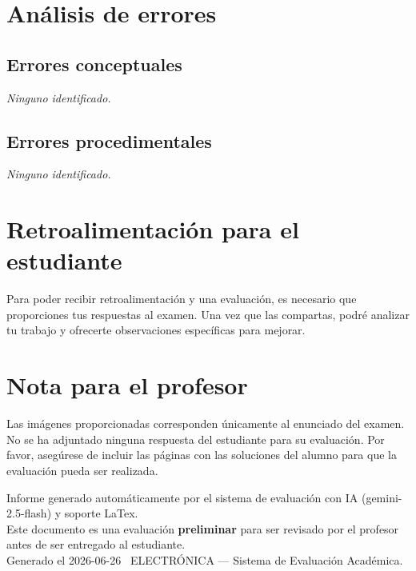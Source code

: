 \documentclass[11pt,a4paper]{article}
\begin{document}
\section*{Análisis de errores}

\subsection*{Errores conceptuales}
\textit{Ninguno identificado.}

\subsection*{Errores procedimentales}
\textit{Ninguno identificado.}

\section*{Retroalimentación para el estudiante}
\begin{tcolorbox}[cajaRecomendacion, title={Dirigido a: 2}]
Para poder recibir retroalimentación y una evaluación, es necesario que proporciones tus respuestas al examen. Una vez que las compartas, podré analizar tu trabajo y ofrecerte observaciones específicas para mejorar.
\end{tcolorbox}

\section*{Nota para el profesor}
\begin{tcolorbox}[
  enhanced, breakable,
  colback=yellow!8, colframe=yellow!60!black,
  fonttitle=\bfseries, coltitle=black,
  title={Observaciones para revisión manual},
  top=4pt, bottom=4pt, left=8pt, right=8pt,
]
Las imágenes proporcionadas corresponden únicamente al enunciado del examen. No se ha adjuntado ninguna respuesta del estudiante para su evaluación. Por favor, asegúrese de incluir las páginas con las soluciones del alumno para que la evaluación pueda ser realizada.
\end{tcolorbox}

\vspace{12pt}
\begin{center}
  \footnotesize\color{gray}
  Informe generado automáticamente por el sistema de evaluación con IA (gemini-2.5-flash) y soporte LaTex. \\
  Este documento es una evaluación \textbf{preliminar} para ser revisado por el profesor antes de ser entregado al 
  estudiante. \\
  Generado el 2026-06-26 \textbullet\ ELECTRÓNICA --- Sistema de Evaluación Académica.
  \end{center}
\end{document}
